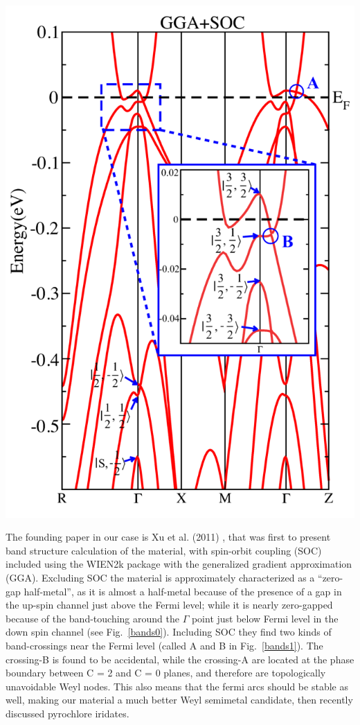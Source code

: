 \documentclass[preprint,pre,floats,aps,amsmath,amssymb]{revtex4}
\begin{document}
\begin{minipage}{.44\linewidth}
\includegraphics[width=1\linewidth]{bands1.png}
\centering{}
\end{minipage}

The founding paper in our case is Xu et al. (2011) \cite{xu}, that was first to present band structure calculation of the material, with spin-orbit coupling (SOC) included using the WIEN2k package with the generalized gradient approximation (GGA). Excluding SOC the material is approximately characterized as a “zero-gap half-metal”, as it is almost a half-metal because of the presence of a gap in the up-spin channel just above the Fermi level; while it is nearly zero-gapped because of the band-touching around the $\Gamma$ point just below Fermi level in the down spin channel (see Fig.~\ref{bands0}). Including SOC they find two kinds of band-crossings near the Fermi level (called A and B in Fig.~\ref{bands1}). The crossing-B is found to be accidental, while the crossing-A are located at the phase boundary between C = 2 and C = 0 planes, and therefore are topologically unavoidable Weyl nodes. This also means that the fermi arcs should be stable as well, making our material a much better Weyl semimetal candidate, then recently discussed pyrochlore iridates.
\end{document}

